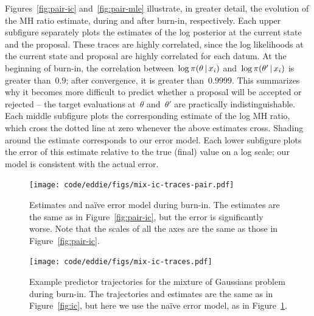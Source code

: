 \documentclass[angelino.tex]{subfiles}
\begin{document}
Figures~\ref{fig:pair-ic} and~\ref{fig:pair-mle} illustrate, in greater detail,
the evolution of the MH ratio estimate, during and after burn-in, respectively.
%
Each upper subfigure separately plots the estimates of the log posterior at the
current state and the proposal.
These traces are highly correlated, since the log likelihoods at the current
state and proposal are highly correlated for each datum.
At the beginning of burn-in, the correlation between~$\log \pi(\theta \,|\, x_i)$
and~$\log \pi(\theta' \,|\, x_i)$ is greater than~${0.9}$;
after convergence, it is greater than~${0.9999}$.
This summarizes why it becomes more difficult to predict whether a proposal will
be accepted or rejected -- the target evaluations at~$\theta$ and~$\theta'$ are
practically indistinguishable.
%
Each middle subfigure plots the corresponding estimate of the log MH ratio,
which cross the dotted line at zero whenever the above estimates cross.
Shading around the estimate corresponds to our error model.
%
Each lower subfigure plots the error of this estimate relative to the true (final)
value on a log scale; our model is consistent with the actual error.

\begin{figure}[t!]
\begin{center}
\texttt{[image: code/eddie/figs/mix-ic-traces-pair.pdf]}
\end{center}
\caption{Estimates and na\"ive error model during burn-in.
The estimates are the same as in Figure~\ref{fig:pair-ic},
but the error is significantly worse.
Note that the scales of all the axes are the same as those in Figure~\ref{fig:pair-ic}.}
\label{fig:naive-error}
\end{figure} 

\begin{figure}[t!]
\begin{center}
\texttt{[image: code/eddie/figs/mix-ic-traces.pdf]}
\end{center}
\caption{Example predictor trajectories for the mixture of Gaussians problem
during burn-in.
The trajectories and estimates are the same as in Figure~\ref{fig:ic},
but here we use the na\"ive error model, as in Figure~\ref{fig:naive-error}.
}
\label{fig:naive-predictor}
\end{figure} 
\end{document}
